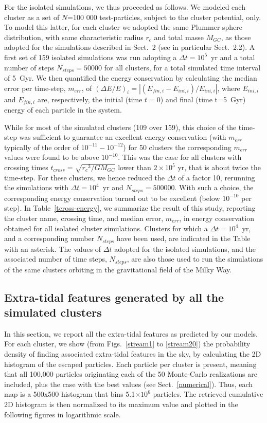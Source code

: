         For the isolated simulations, we thus proceeded as follows. We modeled each cluster as a set of $N$=100 000 test-particles, subject to the cluster potential, only. To model this latter, for each cluster we adopted the same Plummer sphere distribution, with same characteristic radius $r_c$ and total masse $M_{GC}$, as those adopted for the simulations described in Sect.~2 (see in particular Sect.~2.2).  A  first set of 159 isolated simulations was run adopting a   $\Delta t=10^5$~yr and a total number of steps $N_{steps}=50 000$ for all clusters, for a total simulated time interval of 5~Gyr.  We then quantified the energy conservation by calculating the median error per time-step, $m_{err}$, of $(\Delta E/E)_i=|(E_{fin,i}-E_{ini,i})/E_{ini,i}|$, where $E_{ini,i}$ and $E_{fin,i}$ are, respectively, the initial (time $t=0$) and final (time t=5~Gyr) energy of each particle in the system.

        While for most of the simulated clusters (109 over 159), this choice of the time-step was sufficient to guarantee an excellent energy conservation (with $m_{err}$ typically of the order of $10^{-11}-10^{-12}$) for 50 clusters the corresponding $m_{err}$ values were found to be above $10^{-10}$. This was the case for all clusters with crossing times $t_{cross}=\sqrt{{r_c}^3/GM_{GC}}$ lower than $2\times 10^5$ yr, that is about twice the time-step. For these clusters, we hence reduced the $\Delta t$ of a factor 10,  rerunning the simulations with $\Delta t=10^4$~yr and  $N_{steps}=500 000$. With such a choice, the corresponding energy conservation turned out to be excellent (below $10^{-10}$ per step). In Table~\ref{tcross-energy}, we summarize the  result of this study, reporting the cluster name, crossing time, and median error, $m_{err}$, in energy conservation obtained for all isolated cluster simulations. Clusters for which a $\Delta t=10^4$~yr, and a corresponding number $N_{steps}$ have been used, are indicated in the Table with an asterisk. The values of  $\Delta t$ adopted for the isolated simulations, and the associated number of time steps, $N_{steps}$, are also those used to run the simulations of the same clusters orbiting in the gravitational field of the Milky Way. 

    \subsection{Extra-tidal features generated by all the simulated clusters}\label{allstreams}

        In this section, we report all the extra-tidal features as predicted by our models. For each cluster, we show (from Figs.~\ref{stream1} to \ref{stream20}) the probability density of finding associated extra-tidal features in the sky, by calculating the 2D histogram of the escaped particles. Each particle per cluster is present, meaning that all 100,000 particles originating each of the 50 Monte-Carlo realizations are included, plus the case with the best values (see Sect.~\ref{numerical}). Thus, each map is a 500x500 histogram that bins 5.1$\times10^6$ particles. The retrieved cumulative 2D histogram is then normalized to its maximum value and plotted in the following figures in logarithmic scale. 

